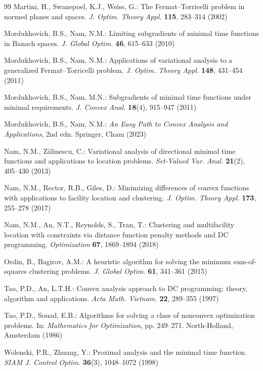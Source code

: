 \documentclass[sn-mathphys-num]{sn-jnl}%
\theoremstyle{definition}
\begin{document}
\begin{thebibliography}{99}
		Martini, H., Swanepoel, K.J., Weiss, G.:
		The Fermat--Torricelli problem in normed planes and spaces.
		\textit{J. Optim. Theory Appl.} \textbf{115}, 283--314 (2002)


		
		Mordukhovich, B.S., Nam, N.M.:
		Limiting subgradients of minimal time functions in Banach spaces.
		\textit{J. Global Optim.} \textbf{46}, 615--633 (2010)
		
		Mordukhovich, B.S., Nam, N.M.:
		Applications of variational analysis to a generalized Fermat--Torricelli problem.
		\textit{J. Optim. Theory Appl.} \textbf{148}, 431--454 (2011)
		
		Mordukhovich, B.S., Nam, M.N.:
		Subgradients of minimal time functions under minimal requirements.
		\textit{J. Convex Anal.} \textbf{18}(4), 915--947 (2011)
		

		
		Mordukhovich, B.S., Nam, N.M.:
		\textit{An Easy Path to Convex Analysis and Applications}, 2nd edn.
		Springer, Cham (2023)
		
		Nam, N.M., Z{\u{a}}linescu, C.:
		Variational analysis of directional minimal time functions and applications to location problems.
		\textit{Set-Valued Var. Anal.} \textbf{21}(2), 405--430 (2013)
		

		Nam, N.M., Rector, R.B., Giles, D.:
		Minimizing differences of convex functions with applications to facility location and clustering.
		\textit{J. Optim. Theory Appl.} \textbf{173}, 255--278 (2017)
		
		Nam, N.M., An, N.T., Reynolds, S., Tran, T.:
		Clustering and multifacility location with constraints via distance function penalty methods and DC programming.
		\textit{Optimization} \textbf{67}, 1869--1894 (2018)
		
		Ordin, B., Bagirov, A.M.:
		A heuristic algorithm for solving the minimum sum-of-squares clustering problems.
		\textit{J. Global Optim.} \textbf{61}, 341--361 (2015)
		
		
		Tao, P.D., An, L.T.H.:
		Convex analysis approach to DC programming: theory, algorithm and applications.
		\textit{Acta Math. Vietnam.} \textbf{22}, 289--355 (1997)
		
		Tao, P.D., Souad, E.B.:
		Algorithms for solving a class of nonconvex optimization problems.
		In: \textit{Mathematics for Optimization}, pp. 249--271.
		North-Holland, Amsterdam (1986)
		
		
		Wolenski, P.R., Zhuang, Y.:
		Proximal analysis and the minimal time function.
		\textit{SIAM J. Control Optim.} \textbf{36}(3), 1048--1072 (1998)
		
	\end{thebibliography}

\end{document}
